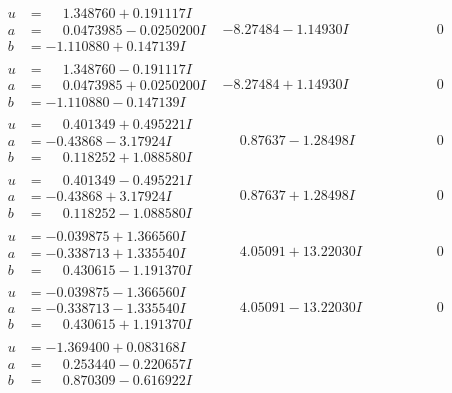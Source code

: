 \documentclass[1p]{elsarticle_modified}
\theoremstyle{definition}
\begin{document}
$$\begin{array}{c|c|c}
\begin{aligned}
u &= \phantom{-}1.348760 + 0.191117 I \\
a &= \phantom{-}0.0473985 - 0.0250200 I \\
b &= -1.110880 + 0.147139 I\end{aligned}
 & -8.27484 - 1.14930 I & \phantom{-0.000000 } 0 \\ \hline\begin{aligned}
u &= \phantom{-}1.348760 - 0.191117 I \\
a &= \phantom{-}0.0473985 + 0.0250200 I \\
b &= -1.110880 - 0.147139 I\end{aligned}
 & -8.27484 + 1.14930 I & \phantom{-0.000000 } 0 \\ \hline\begin{aligned}
u &= \phantom{-}0.401349 + 0.495221 I \\
a &= -0.43868 - 3.17924 I \\
b &= \phantom{-}0.118252 + 1.088580 I\end{aligned}
 & \phantom{-}0.87637 - 1.28498 I & \phantom{-0.000000 } 0 \\ \hline\begin{aligned}
u &= \phantom{-}0.401349 - 0.495221 I \\
a &= -0.43868 + 3.17924 I \\
b &= \phantom{-}0.118252 - 1.088580 I\end{aligned}
 & \phantom{-}0.87637 + 1.28498 I & \phantom{-0.000000 } 0 \\ \hline\begin{aligned}
u &= -0.039875 + 1.366560 I \\
a &= -0.338713 + 1.335540 I \\
b &= \phantom{-}0.430615 - 1.191370 I\end{aligned}
 & \phantom{-}4.05091 + 13.22030 I & \phantom{-0.000000 } 0 \\ \hline\begin{aligned}
u &= -0.039875 - 1.366560 I \\
a &= -0.338713 - 1.335540 I \\
b &= \phantom{-}0.430615 + 1.191370 I\end{aligned}
 & \phantom{-}4.05091 - 13.22030 I & \phantom{-0.000000 } 0 \\ \hline\begin{aligned}
u &= -1.369400 + 0.083168 I \\
a &= \phantom{-}0.253440 - 0.220657 I \\
b &= \phantom{-}0.870309 - 0.616922 I\end{aligned}

\end{array}$$
\end{document}
